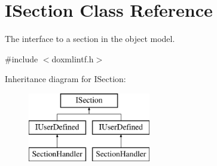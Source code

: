 \hypertarget{class_i_section}{}\section{I\+Section Class Reference}
\label{class_i_section}


The interface to a section in the object model.  




{\ttfamily \#include $<$doxmlintf.\+h$>$}

Inheritance diagram for I\+Section\+:\begin{figure}[H]
\begin{center}
\leavevmode
\includegraphics[height=3.000000cm]{class_i_section}
\end{center}
\end{figure}
